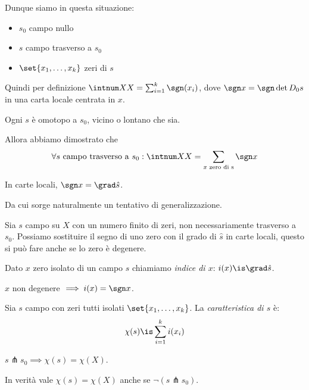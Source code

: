 \noindent Dunque siamo in questa situazione:
\begin{itemize}
	\item $s_0$ campo nullo
	\item $s$ campo trasverso a $s_0$
	\item $\set{x_1,\dots,x_k}$ zeri di $s$
\end{itemize}
Quindi per definizione $\intnum XX=\sum_{i=1}^k\sgn(x_i)$, dove $\sgn x=\sgn\det D_0s$ in una carta locale centrata in $x$.

\begin{oss}
	Ogni $s$ è omotopo a $s_0$, vicino o lontano che sia.
\end{oss}

\noindent Allora abbiamo dimostrato che
\[\forall s\text{ campo trasverso a }s_0:\intnum XX=\sum_{x\text{ zero di s}}\sgn x\]

\begin{oss}
	In carte locali, $\sgn x=\grad\hat s$\footnotemark.
\end{oss}

\noindent Da cui sorge naturalmente un tentativo di generalizzazione.

Sia $s$ campo su $X$ con un numero finito di zeri, non necessariamente trasverso a $s_0$.
Possiamo sostituire il segno di uno zero con il grado di $\hat s$ in carte locali, questo si può fare anche se lo zero è degenere.

\begin{defn}
	Dato $x$ zero isolato di un campo $s$ chiamiamo \emph{indice di $x$}: $i(x)\is\grad\hat s$.
\end{defn}

\begin{oss}
	$x$ non degenere $\implies i(x)=\sgn x$.
\end{oss}

\begin{defn}
	Sia $s$ campo con zeri tutti isolati $\set{x_1,\dots,x_k}$. La \emph{caratteristica di $s$} è:
	\[\chi(s)\is\sum_{i=1}^ki(x_i)\]
\end{defn}

\begin{oss}
	$s\pitchfork s_0\implies\chi(s)=\chi(X)$.
\end{oss}

\begin{teo}[di Hoch]
	In verità vale $\chi(s)=\chi(X)$ anche se $\neg(s\pitchfork s_0)$.
\end{teo}

